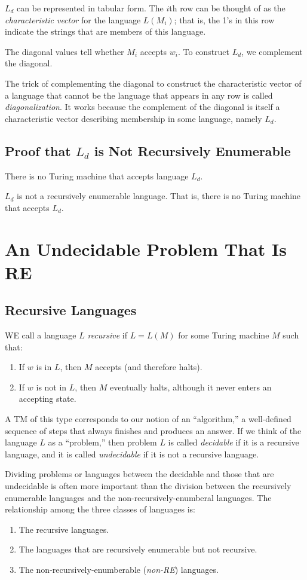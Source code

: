 \documentclass[]{article}
\begin{document}
$L_d$ can be represented in tabular form. The $i$th row can be thought of as the
\emph{characteristic vector} for the language $L(M_i)$; that is, the 1's in this
row indicate the strings that are members of this language.

The diagonal values tell whether $M_i$ accepts $w_i$. To construct $L_d$, we
complement the diagonal.

The trick of complementing the diagonal to construct the characteristic vector
of a language that cannot be the language that appears in any row is called
\emph{diagonalization}. It works because the complement of the diagonal is
itself a characteristic vector describing membership in some language, namely
$L_d$.

\subsection*{Proof that $L_d$ is Not Recursively Enumerable}
There is no Turing machine that accepts language $L_d$.
\begin{thm}
$L_d$ is not a recursively enumerable language. That is, there is no Turing
machine that accepts $L_d$.
\end{thm}

\section*{An Undecidable Problem That Is RE}
\subsection*{Recursive Languages}
WE call a language $L$ \emph{recursive} if $L = L(M)$ for some Turing machine
$M$ such that:
\begin{enumerate}
\item If $w$ is in $L$, then $M$ accepts (and therefore halts).
\item If $w$ is not in $L$, then $M$ eventually halts, although it never enters
an accepting state.
\end{enumerate}
A TM of this type corresponds to our notion of an ``algorithm,'' a well-defined
sequence of steps that always finishes and produces an answer. If we think of
the language $L$ as a ``problem,'' then problem $L$ is called \emph{decidable}
if it is a recursive language, and it is called \emph{undecidable} if it is not
a recursive language.

Dividing problems or languages between the decidable and those that are
undecidable is often more important than the division between the recursively
enumerable languages and the non-recursively-enumberal languages. The
relationship among the three classes of languages is:
\begin{enumerate}
\item The recursive languages.
\item The languages that are recursively enumerable but not recursive.
\item The non-recursively-enumberable (\emph{non-RE}) languages.
\end{enumerate}
\end{document}
